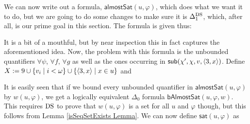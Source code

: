 We can now write out a formula, $\mathsf{almostSat}(u,\varphi)$, which does what we want it to do, but we are going to do some changes to make sure it is $\Delta_1^{\operatorname{DS}}$, which, after all, is our prime goal in this section. The formula is given thus:

It is a bit of a mouthful, but by near inspection this in fact captures the aforementioned idea. Now, the problem with this formula is the unbounded quantifiers $\forall\psi$, $\forall f$, $\forall g$ as well as the ones occurring in $\mathsf{sub}(\chi',\chi,v,\langle 3,x\rangle)$. Define $X:=9\cup\{v_i\mid i<\omega\}\cup\{\langle 3,x\rangle\mid x\in u\}$ and

It is easily seen that if we bound every unbounded quantifier in $\mathsf{almostSat}(u,\varphi)$ by $w(u,\varphi)$, we get a logically equivalent $\Delta_0$ formula $\mathsf{bAlmostSat}(u,\varphi,w)$. This requires $\operatorname{DS}$ to prove that $w(u,\varphi)$ is a set for all $u$ and $\varphi$ though, but this follows from Lemma \ref{isSeqSetExists Lemma}. We can now define $\mathsf{sat}(u,\varphi)$ as

